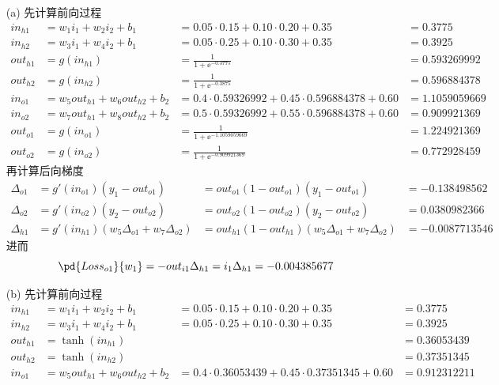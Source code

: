 \documentclass[a4paper, 11pt]{article}
\begin{document}
\begin{answer}
\begin{itemize}
    \item[(a)] 先计算前向过程
    \[\begin{array}{llll}
        in_{h1} &= w_1 i_1 + w_2 i_2 + b_1 &= 0.05\cdot 0.15 + 0.10 \cdot 0.20 + 0.35 &= 0.3775\\
        in_{h2} &= w_3 i_1 + w_4 i_2 + b_1 &= 0.05\cdot 0.25 + 0.10 \cdot 0.30 + 0.35 &= 0.3925\\
        out_{h1} &= g(in_{h1}) &= \frac{1}{1+\ee^{-0.3775}} &=0.593269992\\
        out_{h2} &= g(in_{h2}) &= \frac{1}{1+\ee^{-0.3875}} &=0.596884378\\
        in_{o1} &= w_5 out_{h1} + w_6 out_{h2} +b_2 &= 0.4\cdot 0.59326992 + 0.45\cdot 0.596884378 + 0.60 &= 1.1059059669\\
        in_{o2} &= w_7 out_{h1} + w_8 out_{h2} +b_2 &= 0.5\cdot 0.59326992 + 0.55\cdot 0.596884378 + 0.60 &= 0.909921369\\
        out_{o1} &= g(in_{o1}) &=\frac{1}{1+\ee^{-1.1059059669}} &= 1.224921369\\
        out_{o2} &= g(in_{o2}) &=\frac{1}{1+\ee^{-0.909921369}} &= 0.772928459
    \end{array}\]
    再计算后向梯度
    \[\begin{array}{llll}
        \Delta_{o1}&=g'(in_{o1})(y_1-out_{o1})&=out_{o1}(1-out_{o1})(y_1-out_{o1})&=-0.138498562\\
        \Delta_{o2}&=g'(in_{o2})(y_2-out_{o2})&=out_{o2}(1-out_{o2})(y_2-out_{o2})&=0.0380982366\\
        \Delta_{h1}&=g'(in_{h1})(w_5\Delta_{o1}+w_7\Delta_{o2})&=out_{h1}(1-out_{h1})(w_5\Delta_{o1}+w_7\Delta_{o2})&=-0.0087713546
    \end{array}\]
    进而
    \[\pd{Loss_{o1}}{w_1}=-out_{i1}\Delta_{h1}=i_1\Delta_{h1}=-0.004385677\]
    \item[(b)] 先计算前向过程
    \[\begin{array}{llll}
        in_{h1} &= w_1 i_1 + w_2 i_2 + b_1 &= 0.05\cdot 0.15 + 0.10 \cdot 0.20 + 0.35 &= 0.3775\\
        in_{h2} &= w_3 i_1 + w_4 i_2 + b_1 &= 0.05\cdot 0.25 + 0.10 \cdot 0.30 + 0.35 &= 0.3925\\
        out_{h1} &= \tanh(in_{h1}) & &=0.36053439\\
        out_{h2} &= \tanh(in_{h2}) & &=0.37351345\\
        in_{o1} &= w_5 out_{h1} + w_6 out_{h2} +b_2 &= 0.4\cdot 0.36053439 + 0.45\cdot 0.37351345 + 0.60 &= 0.912312211\\

\end{array}\]
\end{itemize}
\end{answer}
\end{document}
